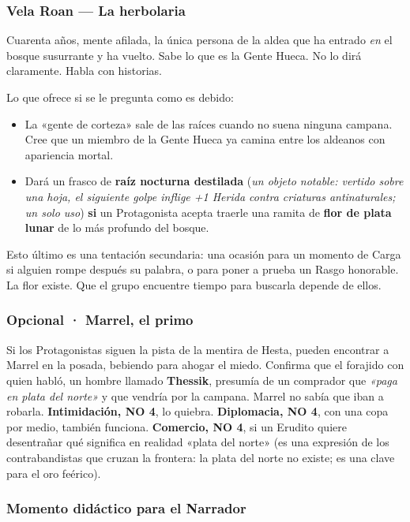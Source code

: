 \documentclass[10pt,a4paper]{article}
\newcommand{\tightlist}{\setlength{\itemsep}{0pt}\setlength{\parskip}{0pt}}
\begin{document}
\subsubsection{Vela Roan --- La herbolaria}\label{vela-roan-la-herbolaria}

Cuarenta años, mente afilada, la única persona de la aldea que ha entrado \emph{en} el bosque susurrante y ha vuelto. Sabe lo que es la Gente Hueca. No lo dirá claramente. Habla con historias.

Lo que ofrece si se le pregunta como es debido:

\begin{itemize}
\tightlist
\item
  La «gente de corteza» sale de las raíces cuando no suena ninguna campana. Cree que un miembro de la Gente Hueca ya camina entre los aldeanos con apariencia mortal.
\item
  Dará un frasco de \textbf{raíz nocturna destilada} (\emph{un objeto notable: vertido sobre una hoja, el siguiente golpe inflige +1 Herida contra criaturas antinaturales; un solo uso}) \textbf{si} un Protagonista acepta traerle una ramita de \textbf{flor de plata lunar} de lo más profundo del bosque.
\end{itemize}

Esto último es una tentación secundaria: una ocasión para un momento de Carga si alguien rompe después su palabra, o para poner a prueba un Rasgo honorable. La flor existe. Que el grupo encuentre tiempo para buscarla depende de ellos.

\subsubsection{Opcional · Marrel, el primo}\label{opcional-marrel-el-primo}

Si los Protagonistas siguen la pista de la mentira de Hesta, pueden encontrar a Marrel en la posada, bebiendo para ahogar el miedo. Confirma que el forajido con quien habló, un hombre llamado \textbf{Thessik}, presumía de un comprador que \emph{«paga en plata del norte»} y que vendría por la campana. Marrel no sabía que iban a robarla. \textbf{Intimidación, NO 4}, lo quiebra. \textbf{Diplomacia, NO 4}, con una copa por medio, también funciona. \textbf{Comercio, NO 4}, si un Erudito quiere desentrañar qué significa en realidad «plata del norte» (es una expresión de los contrabandistas que cruzan la frontera: la plata del norte no existe; es una clave para el oro feérico).

\subsubsection{Momento didáctico para el Narrador}\label{consejo-para-el-narrador}
\end{document}
